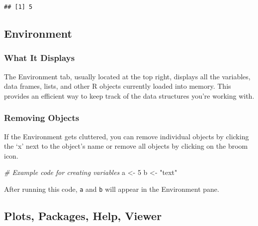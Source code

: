 \documentclass[
  b5paper]{book}
\newenvironment{Shaded}{\begin{snugshade}}{\end{snugshade}}
\newcommand{\CommentTok}[1]{\textcolor[rgb]{0.56,0.35,0.01}{\textit{#1}}}
\newcommand{\DecValTok}[1]{\textcolor[rgb]{0.00,0.00,0.81}{#1}}
\newcommand{\NormalTok}[1]{#1}
\newcommand{\OtherTok}[1]{\textcolor[rgb]{0.56,0.35,0.01}{#1}}
\newcommand{\StringTok}[1]{\textcolor[rgb]{0.31,0.60,0.02}{#1}}
\begin{document}
\begin{verbatim}
## [1] 5
\end{verbatim}

\hypertarget{environment}{%
\subsection*{Environment}\label{environment}}

\hypertarget{what-it-displays}{%
\subsubsection*{What It Displays}\label{what-it-displays}}

The Environment tab, usually located at the top right, displays all the variables, data frames, lists, and other R objects currently loaded into memory. This provides an efficient way to keep track of the data structures you're working with.

\hypertarget{removing-objects}{%
\subsubsection*{Removing Objects}\label{removing-objects}}

If the Environment gets cluttered, you can remove individual objects by clicking the `x' next to the object's name or remove all objects by clicking on the broom icon.

\begin{Shaded}
\begin{Highlighting}[]
\CommentTok{\# Example code for creating variables}
\NormalTok{a }\OtherTok{\textless{}{-}} \DecValTok{5}
\NormalTok{b }\OtherTok{\textless{}{-}} \StringTok{"text"}
\end{Highlighting}
\end{Shaded}

After running this code, \texttt{a} and \texttt{b} will appear in the Environment pane.

\hypertarget{plots-packages-help-viewer}{%
\subsection*{Plots, Packages, Help, Viewer}\label{plots-packages-help-viewer}}
\end{document}
